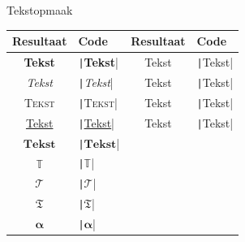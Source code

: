 \begin{frame}{Tekstopmaak}
	\begin{tabular}{c p{4.1cm} | c p{3cm}}
		Resultaat & Code  & Resultaat & Code \\
		\hline
		\textbf{Tekst} & \texttt|\textbf{Tekst}|  & {\tiny Tekst} & \texttt|{\tiny Tekst}| \\
		\textit{Tekst} & \texttt|\textit{Tekst}| & {\small Tekst} & \texttt|{\small Tekst}| \\
		\textsc{Tekst} & \texttt|\textsc{Tekst}|  & {\large Tekst} & \texttt|{\large Tekst}| \\
		\underline{Tekst} & \texttt|\underline{Tekst}|  & {\huge Tekst} & \texttt|{\huge Tekst}| \\
		\hline
		$\mathbf{Tekst}$ & \texttt|$\mathbf{Tekst}$|  & & \\
		$\mathbb{T}$ & \texttt|$\mathbb{T}$|   & & \\
		$\mathcal{T}$ & \texttt|$\mathcal{T}$|  & & \\
		$\mathfrak{T}$ & \texttt|$\mathfrak{T}$| & & \\
		$\boldsymbol{\alpha}$ & \texttt|$\boldsymbol{\alpha}$|  & &\\
	\end{tabular}
\end{frame}